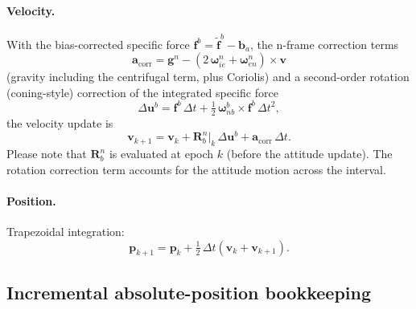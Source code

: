 \documentclass[11pt,a4paper]{article}
\newcommand{\vect}[1]{\bm{#1}}
\newcommand{\mat}[1]{\bm{#1}}
\newcommand{\nframe}{n}
\newcommand{\bframe}{b}
\newcommand{\eframe}{e}
\newcommand{\Rbn}{\mat{R}_{\bframe}^{\nframe}}
\newcommand{\dt}{\Delta t}
\begin{document}
\paragraph{Velocity.} With the bias-corrected specific force
$\vect{f}^\bframe = \tilde{\vect{f}}^\bframe - \vect{b}_a$, the n-frame
correction terms
\begin{equation}
  \vect{a}_{\text{corr}}
  = \vect{g}^\nframe
  - \left(2\,\vect{\omega}^\nframe_{i\eframe}
        + \vect{\omega}^\nframe_{\eframe\nframe}\right)
    \times \vect{v}
\end{equation}
(gravity including the centrifugal term, plus Coriolis) and a second-order
rotation (coning-style) correction of the integrated specific force
\cite{titterton2004,wendel2011}
\begin{equation}
  \Delta\vect{u}^\bframe
  = \vect{f}^\bframe\,\dt
  + \tfrac{1}{2}\,\vect{\omega}^\bframe_{\nframe\bframe}
    \times \vect{f}^\bframe\,\dt^2 ,
\end{equation}
the velocity update is
\begin{equation}
  \vect{v}_{k+1} = \vect{v}_k + \Rbn\big|_k\,\Delta\vect{u}^\bframe
                 + \vect{a}_{\text{corr}}\,\dt .
\end{equation}
Please note that $\Rbn$ is evaluated at epoch $k$ (before the attitude update).
The rotation correction term accounts for the attitude motion across
the interval.

\paragraph{Position.} Trapezoidal integration:
\begin{equation}
  \vect{p}_{k+1} = \vect{p}_k
  + \tfrac{1}{2}\,\dt\left(\vect{v}_k + \vect{v}_{k+1}\right).
\end{equation}

\subsection{Incremental absolute-position bookkeeping}
\label{sec:llh}
\end{document}
